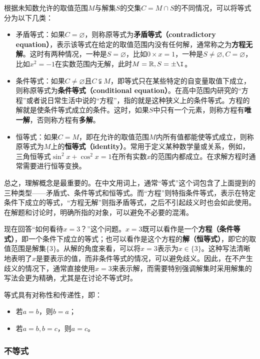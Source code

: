 根据未知数允许的取值范围$M$与解集$S$的交集$C=M\cap S$的不同情况，可以将等式分为以下几类：
\begin{itemize}
\item 矛盾等式：如果$C = \varnothing$，则称原等式为\textbf{矛盾等式（contradictory equation）}，表示该等式在给定的取值范围内没有任何解，通常称之为\textbf{方程无解}。这时有两种情况，一种是$S=\varnothing$，比如$0\times x=1$，一种是$S\neq\varnothing,C=\varnothing$，比如$x^2=-1$在实数范围内无解，此时$M=\mathbb{R},S={\pm \I}$。
\item 条件等式：如果$C \neq \varnothing$且$C \subsetneqq M$，即等式只在某些特定的自变量取值下成立，则称原等式为\textbf{条件等式（conditional equation）}。在高中范围内研究的“方程”或者说日常生活中说的“方程”，指的就是这种狭义上的条件等式。方程的解就是使条件等式成立的条件。这时，如果$S$中只有一个元素，则称方程有\textbf{唯一解}，否则称方程有\textbf{多解}。
\item 恒等式：如果$C = M$，即在允许的取值范围$M$内所有值都能使等式成立，则称原等式为$M$上的\textbf{恒等式（identity）}。常用于定义某种数学量或关系，例如，三角恒等式$\sin^2 x + \cos^2 x = 1$在所有实数$x$的范围内都成立。在求解方程时通常需要进行恒等变换。
\end{itemize}

总之，理解概念是最重要的。在中文用词上，通常“等式”这个词包含了上面提到的三种类型——矛盾式、条件等式和恒等式。而“方程”则特指条件等式，表示在特定条件下成立的等式，“方程无解”则指矛盾等式，之后不引起歧义时也会如此使用。在解题和讨论时，明确所指的对象，可以避免不必要的混淆。

现在回答“如何看待$x = 3$？”这个问题。$x = 3$既可以看作是一个\textbf{方程（条件等式）}，即一个条件下成立的等式；也可以看作是这个方程的\textbf{解（恒等式）}，即它的取值范围是解集$\{3\}$。从解的角度来看，可以将$x = 3$表示为$x \in \{3\}$。这种写法清晰地表明了$x$是要表示的值，而非条件等式的情况，可以避免歧义。因此，在不产生歧义的情况下，通常直接使用$x = 3$来表示解，而需要特别强调解集时采用解集的写法会更为精确，尤其是在讨论不等式时。

等式具有对称性和传递性，即：
\begin{itemize}
\item 若$a=b$，则$b=a$；
\item 若$a=b,b=c$，则$a=c$。
\end{itemize}

\subsubsection{不等式}

